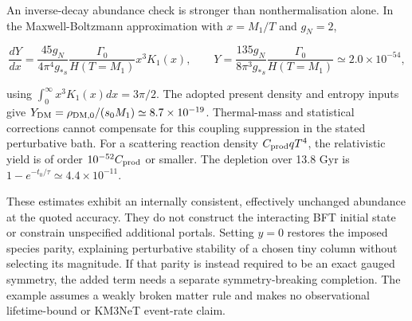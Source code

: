\documentclass[
]{article}
\begin{document}
An inverse-decay abundance check is stronger than nonthermalisation
alone. In the Maxwell-Boltzmann approximation with \(x=M_1/T\) and
\(g_N=2\),

\[
\frac{dY}{dx}=\frac{45g_N}{4\pi^4g_{*s}}\frac{\Gamma_0}{H(T=M_1)}x^3K_1(x),
\qquad
Y=\frac{135g_N}{8\pi^3g_{*s}}\frac{\Gamma_0}{H(T=M_1)}\simeq2.0\times10^{-54},
\]

using \(\int_0^\infty x^3K_1(x)dx=3\pi/2\). The adopted present density
and entropy inputs give
\(Y_{\rm DM}=\rho_{\rm DM,0}/(s_0M_1)\simeq8.7\times10^{-19}\).
Thermal-mass and statistical corrections cannot compensate for this
coupling suppression in the stated perturbative bath. For a scattering
reaction density \(C_{\rm prod}qT^4\), the relativistic yield is of
order \(10^{-52}C_{\rm prod}\) or smaller. The depletion over 13.8 Gyr
is \(1-e^{-t_0/\tau}\simeq4.4\times10^{-11}\).

These estimates exhibit an internally consistent, effectively unchanged
abundance at the quoted accuracy. They do not construct the interacting
BFT initial state or constrain unspecified additional portals. Setting
\(y=0\) restores the imposed species parity, explaining perturbative
stability of a chosen tiny column without selecting its magnitude. If
that parity is instead required to be an exact gauged symmetry, the
added term needs a separate symmetry-breaking completion. The example
assumes a weakly broken matter rule and makes no observational
lifetime-bound or KM3NeT event-rate claim.
\end{document}
